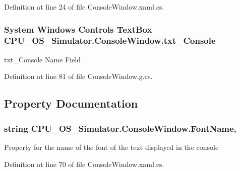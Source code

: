 Definition at line 24 of file Console\+Window.\+xaml.\+cs.

\hypertarget{class_c_p_u___o_s___simulator_1_1_console_window_ad1d4a0c5f573c7e89c8d6ed57d5097e0}{}
\subsubsection[{txt\+\_\+\+Console}]{\setlength{\rightskip}{0pt plus 5cm}System Windows Controls Text\+Box C\+P\+U\+\_\+\+O\+S\+\_\+\+Simulator.\+Console\+Window.\+txt\+\_\+\+Console}\label{class_c_p_u___o_s___simulator_1_1_console_window_ad1d4a0c5f573c7e89c8d6ed57d5097e0}


txt\+\_\+\+Console Name Field 



Definition at line 81 of file Console\+Window.\+g.\+cs.



\subsection{Property Documentation}
\hypertarget{class_c_p_u___o_s___simulator_1_1_console_window_a752c6bed63b2368b26a4287a2902ef61}{}
\subsubsection[{Font\+Name}]{\setlength{\rightskip}{0pt plus 5cm}string C\+P\+U\+\_\+\+O\+S\+\_\+\+Simulator.\+Console\+Window.\+Font\+Name\hspace{0.3cm}{\ttfamily [get]}, {\ttfamily [set]}}\label{class_c_p_u___o_s___simulator_1_1_console_window_a752c6bed63b2368b26a4287a2902ef61}


Property for the name of the font of the text displayed in the console 



Definition at line 70 of file Console\+Window.\+xaml.\+cs.

